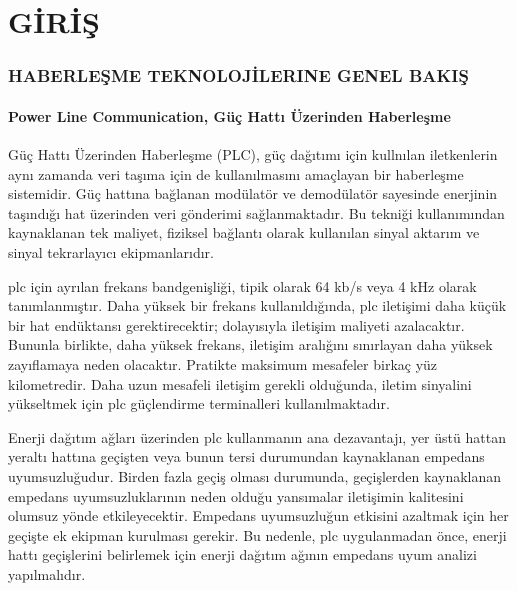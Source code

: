 
\part{GİRİŞ}
\thispagestyle{empty}
\newpage
\section{HABERLEŞME TEKNOLOJİLERINE GENEL BAKIŞ} \label{girisHaberlesme}
\subsection{Power Line Communication, Güç Hattı Üzerinden Haberleşme}
Güç Hattı Üzerinden Haberleşme (PLC), güç dağıtımı için kullnılan iletkenlerin aynı zamanda veri taşıma için de kullanılmasını amaçlayan bir haberleşme sistemidir. Güç hattına bağlanan modülatör ve demodülatör sayesinde enerjinin taşındığı hat üzerinden veri gönderimi sağlanmaktadır. Bu tekniği kullanımından kaynaklanan tek maliyet, fiziksel bağlantı olarak kullanılan sinyal aktarım ve sinyal tekrarlayıcı ekipmanlarıdır.

\gls{plc} için ayrılan frekans bandgenişliği, tipik olarak 64 kb/s veya 4 kHz olarak tanımlanmıştır. Daha yüksek bir frekans kullanıldığında, \gls{plc} iletişimi daha küçük bir hat endüktansı gerektirecektir; dolayısıyla iletişim maliyeti azalacaktır. Bununla birlikte, daha yüksek frekans, iletişim aralığını sınırlayan daha yüksek zayıflamaya neden olacaktır. Pratikte maksimum mesafeler birkaç yüz kilometredir. Daha uzun mesafeli iletişim gerekli olduğunda, iletim sinyalini yükseltmek için \gls{plc} güçlendirme terminalleri kullanılmaktadır.

Enerji dağıtım ağları üzerinden \gls{plc} kullanmanın ana dezavantajı, yer üstü hattan yeraltı hattına geçişten veya bunun tersi durumundan kaynaklanan empedans uyumsuzluğudur. Birden fazla geçiş olması durumunda, geçişlerden kaynaklanan empedans uyumsuzluklarının neden olduğu yansımalar iletişimin kalitesini olumsuz yönde etkileyecektir. Empedans uyumsuzluğun etkisini azaltmak için her geçişte ek ekipman kurulması gerekir. Bu nedenle, \gls{plc} uygulanmadan önce, enerji hattı geçişlerini belirlemek için enerji dağıtım ağının empedans uyum analizi yapılmalıdır\cite{duluau2015scada}.
\begin{comment}
\subsection{Radyo Dalgası}
Özellikle yenilenebilir enerji santrallerinin dağıtık kurulumundan kaynaklı, üre-tilen enerjinin merkeziyetçil kontrolü için bakır tel veya fiber optik kullanımı, kabloları döşemek ve güzergah için yapılacak altyapı işleri yüksek maliyetler gerektirmektedir. Radyo iletişimi kablolu haberleşme sistemlerinin getirmiş olduğu bant genişliğinin yerini almasa da radyo ağlarının güvenilirliği, performansı ve işletme maliyetleri son yıllarda önemli ölçüde artmıştır. Bu gelişmelerde kaynaklı olarak dağıtık enerji sistemlerinde tercih edilen bir haberleşme teknolojisidir\cite{bai2020radio}.
\end{comment}

